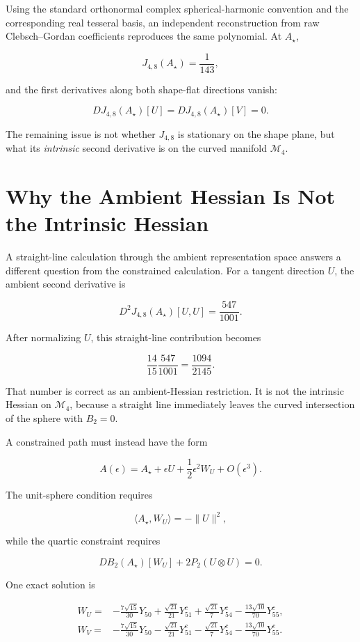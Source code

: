 Using the standard orthonormal complex spherical-harmonic convention and the corresponding real tesseral basis, an independent reconstruction from raw Clebsch--Gordan coefficients reproduces the same polynomial. At $A_\star$,

\[
J_{4,8}(A_\star)=\frac1{143},
\]

and the first derivatives along both shape-flat directions vanish:

\[
DJ_{4,8}(A_\star)[U]=DJ_{4,8}(A_\star)[V]=0.
\]

The remaining issue is not whether $J_{4,8}$ is stationary on the shape plane, but what its \emph{intrinsic} second derivative is on the curved manifold $\mathcal M_4$.

\section{Why the Ambient Hessian Is Not the Intrinsic Hessian}

A straight-line calculation through the ambient representation space answers a different question from the constrained calculation. For a tangent direction $U$, the ambient second derivative is

\[
D^2J_{4,8}(A_\star)[U,U]=\frac{547}{1001}.
\]

After normalizing $U$, this straight-line contribution becomes

\[
\frac{14}{15}\frac{547}{1001}=\frac{1094}{2145}.
\]

That number is correct as an ambient-Hessian restriction. It is not the intrinsic Hessian on $\mathcal M_4$, because a straight line immediately leaves the curved intersection of the sphere with $B_2=0$.

A constrained path must instead have the form

\[
A(\epsilon)=A_\star+\epsilon U+\frac12\epsilon^2W_U+O(\epsilon^3).
\]

The unit-sphere condition requires

\[
\langle A_\star,W_U\rangle=-\|U\|^2,
\]

while the quartic constraint requires

\[
DB_2(A_\star)[W_U]+2P_2(U\otimes U)=0.
\]

One exact solution is

\begin{align*}
W_U={}&-\frac{7\sqrt{15}}{30}Y_{50}
+\frac{\sqrt{21}}{21}Y^c_{51}
+\frac{\sqrt{21}}7Y^c_{54}
-\frac{13\sqrt{10}}{70}Y^c_{55},\\
W_V={}&-\frac{7\sqrt{15}}{30}Y_{50}
-\frac{\sqrt{21}}{21}Y^c_{51}
-\frac{\sqrt{21}}7Y^c_{54}
-\frac{13\sqrt{10}}{70}Y^c_{55}.
\end{align*}

